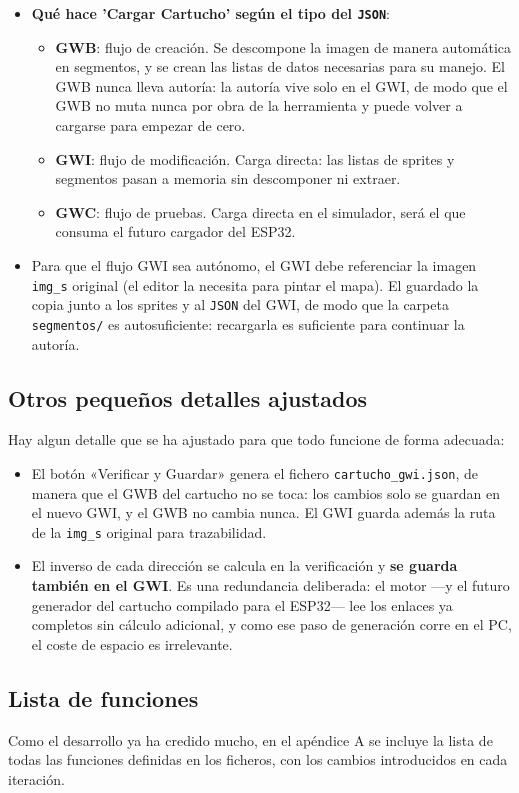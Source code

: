 \begin{itemize}
		\item  \textbf{Qué hace 'Cargar Cartucho' según el tipo del \texttt{JSON}}:
	
	\begin{itemize}
		\item \textbf{GWB}: flujo de creación. Se descompone la imagen de manera automática en segmentos, y se crean las  listas de datos necesarias para su manejo. El GWB nunca lleva autoría: la autoría vive solo en el GWI, de modo que el GWB no muta nunca por obra de la herramienta y puede volver a cargarse para empezar de cero.
		\item \textbf{GWI}: flujo de modificación. Carga directa: las listas de sprites y segmentos pasan a memoria sin descomponer ni extraer.
		\item \textbf{GWC}: flujo de pruebas. Carga directa en el simulador, será el que consuma el futuro cargador del ESP32.
	\end{itemize}
	
	\item 	Para que el flujo GWI sea autónomo, el GWI debe referenciar la imagen \texttt{img\_s} original (el editor la necesita para pintar el mapa). El guardado la copia junto a los sprites y al \texttt{JSON} del GWI, de modo que la carpeta \texttt{segmentos/} es autosuficiente: recargarla es suficiente para continuar la autoría.
\end{itemize}


\subsection{Otros pequeños detalles ajustados}
	Hay algun detalle que se ha ajustado para que todo funcione de forma adecuada:
\begin{itemize}
	\item El botón «Verificar y Guardar» genera el fichero \texttt{cartucho\_gwi.json}, de manera que el GWB del cartucho no se toca: los cambios solo se guardan en el nuevo GWI, y el GWB no cambia nunca. El GWI guarda además la ruta de la \texttt{img\_s} original para trazabilidad.
	\item El inverso de cada dirección se calcula en la verificación y \textbf{se guarda también en el GWI}. Es una redundancia deliberada: el motor —y el futuro generador del cartucho compilado para el ESP32— lee los enlaces ya completos sin cálculo adicional, y como ese paso de generación corre en el PC, el coste de espacio es irrelevante.
\end{itemize}

\subsection{Lista de funciones}
Como el desarrollo ya ha credido mucho, en el apéndice A se incluye la lista de todas las funciones definidas en los ficheros, con los cambios introducidos en cada iteración.

\clearpage